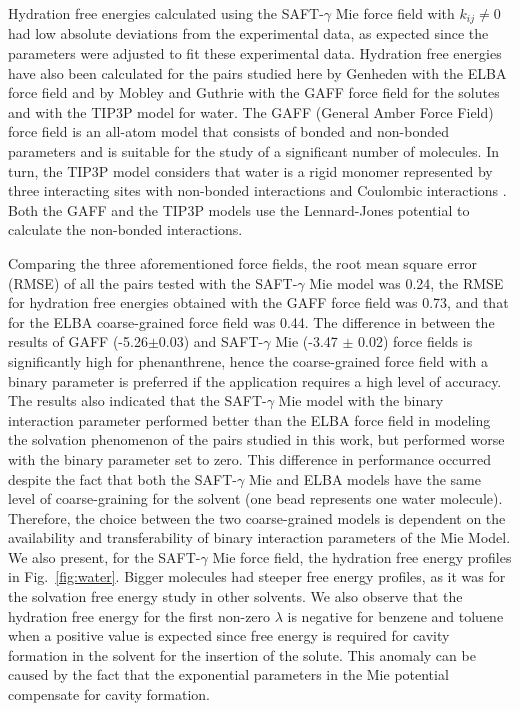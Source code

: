 \documentclass[final,12p,times,twocolumn]{elsarticle}
\begin{document}
	Hydration free energies calculated using the SAFT-$\gamma$ Mie force field with $k_{ij} \neq 0$ had low absolute deviations from the experimental data, as expected since the parameters were adjusted to fit these experimental data. Hydration free energies have also been calculated for the pairs studied here by Genheden \cite{doi:10.1021/acs.jctc.5b00963} with the ELBA force field and by Mobley and Guthrie \cite{PMID:24928188} with the GAFF force field for the solutes and with the TIP3P model for water. The GAFF (General Amber Force Field) force field is an all-atom model that consists of bonded and non-bonded parameters and is suitable for the study of a significant number of molecules. In turn, the TIP3P model considers that water is a rigid monomer represented by three interacting sites with non-bonded interactions and Coulombic interactions \cite{doi:10.1063/1.445869}. Both the GAFF and the TIP3P models use the Lennard-Jones potential to calculate the non-bonded interactions.
	
	Comparing the three aforementioned force fields, the root mean square error (RMSE) of all the pairs tested with the SAFT-$\gamma$ Mie model was  0.24, the RMSE for hydration free energies obtained with the GAFF force field was 0.73, and that for the ELBA coarse-grained force field was 0.44. The difference in between the results of GAFF (-5.26$\pm$0.03) and SAFT-$\gamma$ Mie (-3.47 $\pm$ 0.02) force fields is significantly high for phenanthrene, hence the coarse-grained force field with a binary parameter is preferred if the application requires a high level of accuracy. The results also indicated that the SAFT-$\gamma$ Mie model with the binary interaction parameter performed better than the ELBA force field in modeling the solvation phenomenon of the pairs studied in this work, but performed worse with the binary parameter set to zero. This difference in performance occurred despite the fact that both the SAFT-$\gamma$ Mie and ELBA models have the same level of coarse-graining for the solvent (one bead represents one water molecule). Therefore, the choice between the two coarse-grained models is dependent on the availability and transferability of binary interaction parameters of the Mie Model. We also present, for the SAFT-$\gamma$ Mie force field, the hydration free energy profiles in Fig.~\ref{fig:water}. Bigger molecules had steeper free energy profiles, as it was for the solvation free energy study in other solvents. We also observe that the hydration free energy for the first non-zero $\lambda$ is negative for benzene and toluene when a positive value is expected since free energy is required for cavity formation in the solvent for the insertion of the solute. This anomaly can be caused by the fact that the exponential parameters in the Mie potential compensate for cavity formation.  
	
\end{document}
